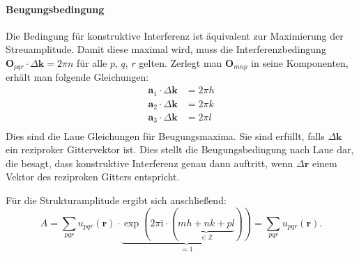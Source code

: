 \paragraph{Beugungsbedingung}
Die Bedingung für konstruktive Interferenz ist äquivalent zur Maximierung der Streuamplitude.
Damit diese maximal wird, muss die Interferenzbedingung $\mathbf{O}_{pqr}\cdot\Delta \mathbf{k} =2\pi n$
für alle $p$, $q$, $r$ gelten.
Zerlegt man $\mathbf{O}_{mnp}$ in seine Komponenten, erhält man folgende Gleichungen:
\begin{align}
    \mathbf{a}_{1}\cdot\Delta \mathbf{k} &= 2\pi h \\
    \mathbf{a}_{2}\cdot\Delta \mathbf{k} &= 2\pi k \\
    \mathbf{a}_{3}\cdot\Delta \mathbf{k} &= 2\pi l \\
\end{align}
Dies sind die Laue Gleichungen für Beugungsmaxima.
Sie sind erfüllt, falls $\Delta \mathbf{k}$ ein reziproker Gittervektor ist.
Dies stellt die Beugungsbedingung nach Laue dar, die besagt, dass konstruktive Interferenz genau dann auftritt,
wenn $\Delta \mathbf{r}$ einem Vektor des reziproken Gitters entspricht.

Für die Strukturamplitude ergibt sich anschließend:
\begin{equation}
    A = \sum_{pqr} u_{pqr}(\mathbf{r}) \cdot\underbrace{ \exp(2\pi \mathrm{i}
    \cdot(\underbrace{ mh+nk+pl }_{ \in\mathbb{Z} })) }_{ =1 }
    = \sum_{pqr} u_{pqr}(\mathbf{r}).
    \label{eq:strukturamplitude}
\end{equation}

